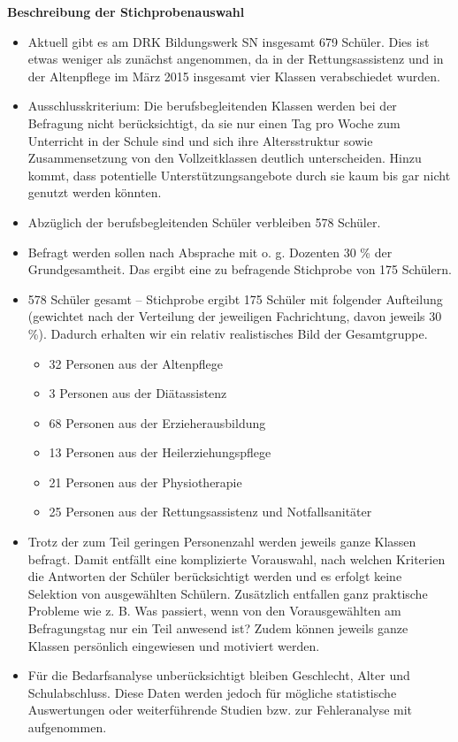 \textbf{Beschreibung der Stichprobenauswahl}
\begin{itemize}
	\item Aktuell gibt es am DRK Bildungswerk SN insgesamt 679 Schüler. Dies ist etwas weniger als zunächst angenommen, da in der Rettungsassistenz und in der Altenpflege im März 2015 insgesamt vier Klassen verabschiedet wurden.
	\item Ausschlusskriterium: Die berufsbegleitenden Klassen werden bei der Befragung nicht berücksichtigt, da sie nur einen Tag pro Woche zum Unterricht in der Schule sind und sich ihre Altersstruktur sowie Zusammensetzung von den Vollzeitklassen deutlich unterscheiden. Hinzu kommt, dass potentielle Unterstützungsangebote durch sie kaum bis gar nicht genutzt werden könnten.
	\item Abzüglich der berufsbegleitenden Schüler verbleiben 578 Schüler.
	\item Befragt werden sollen nach Absprache mit o. g. Dozenten 30 \% der Grundgesamtheit. Das ergibt eine zu befragende Stichprobe von 175 Schülern.
	\item 578 Schüler gesamt -- Stichprobe ergibt 175 Schüler mit folgender Aufteilung (gewichtet nach der Verteilung der jeweiligen Fachrichtung, davon jeweils 30 \%). Dadurch erhalten wir ein relativ realistisches Bild der Gesamtgruppe. 
		\begin{itemize}
			\item 32 Personen aus der Altenpflege 
			\item 3 Personen aus der Diätassistenz
			\item 68 Personen aus der Erzieherausbildung 
			\item 13 Personen aus der Heilerziehungspflege 
			\item 21 Personen aus der Physiotherapie
			\item 25 Personen aus der Rettungsassistenz und Notfallsanitäter
		\end{itemize}
	\item Trotz der zum Teil geringen Personenzahl werden jeweils ganze Klassen befragt. Damit entfällt eine komplizierte Vorauswahl, nach welchen Kriterien die Antworten der Schüler berücksichtigt werden und es erfolgt keine Selektion von ausgewählten Schülern. Zusätzlich entfallen ganz praktische Probleme wie z. B. Was passiert, wenn von den Vorausgewählten am Befragungstag nur ein Teil anwesend ist? Zudem können jeweils ganze Klassen persönlich eingewiesen und motiviert werden.
	\item Für die Bedarfsanalyse unberücksichtigt bleiben Geschlecht, Alter und Schulabschluss. Diese Daten werden jedoch für mögliche statistische Auswertungen oder weiterführende Studien bzw. zur Fehleranalyse mit aufgenommen.

\end{itemize}
